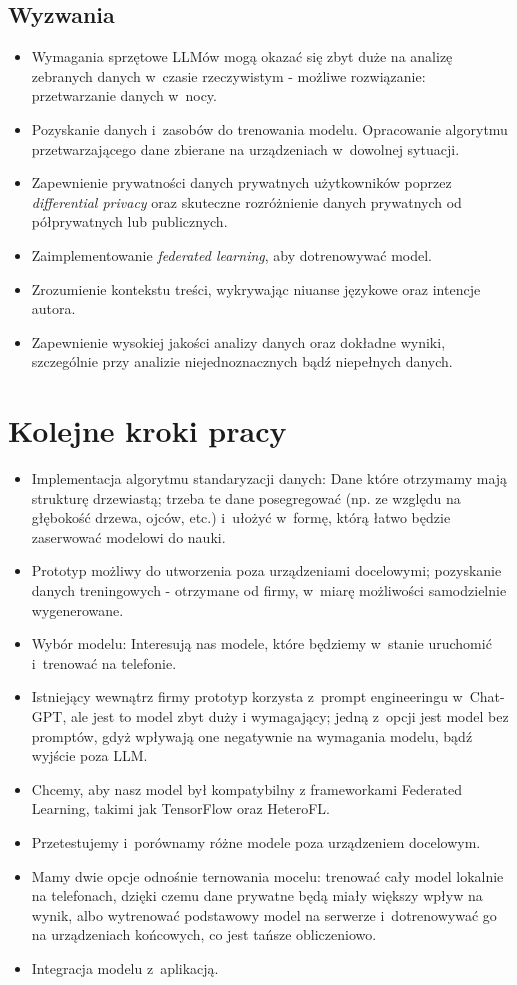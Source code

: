 \documentclass[12pt]{article}
\begin{document}
\subsection*{Wyzwania}
\begin{itemize}
    \item Wymagania sprzętowe LLMów mogą okazać się zbyt duże na analizę zebranych danych w~czasie rzeczywistym - możliwe rozwiązanie: przetwarzanie danych w~nocy.
    \item Pozyskanie danych i~zasobów do trenowania modelu. Opracowanie algorytmu przetwarzającego dane zbierane na urządzeniach w~dowolnej sytuacji.
    \item Zapewnienie prywatności danych prywatnych użytkowników poprzez \emph{differential privacy} oraz skuteczne rozróżnienie danych prywatnych od półprywatnych lub publicznych.
    \item Zaimplementowanie \emph{federated learning}, aby dotrenowywać model.
    \item Zrozumienie kontekstu treści, wykrywając niuanse językowe oraz intencje autora.
    \item Zapewnienie wysokiej jakości analizy danych oraz dokładne wyniki, szczególnie przy analizie niejednoznacznych bądź niepełnych danych.
\end{itemize}

\section*{Kolejne kroki pracy}
\begin{itemize}
    \item Implementacja algorytmu standaryzacji danych: Dane które otrzymamy mają strukturę drzewiastą; trzeba te dane posegregować (np. ze względu na głębokość drzewa, ojców, etc.) i~ułożyć w~formę, którą łatwo będzie zaserwować modelowi do nauki.
    \item Prototyp możliwy do utworzenia poza urządzeniami docelowymi; pozyskanie danych treningowych - otrzymane od firmy, w~miarę możliwości samodzielnie wygenerowane.
    \item Wybór modelu: Interesują nas modele, które będziemy w~stanie uruchomić i~trenować na telefonie.
    \item Istniejący wewnątrz firmy prototyp korzysta z~prompt engineeringu w~Chat-GPT, ale jest to model zbyt duży i wymagający; jedną z~opcji jest model bez promptów, gdyż wpływają one negatywnie na wymagania modelu, bądź wyjście poza LLM.
    \item Chcemy, aby nasz model był kompatybilny z frameworkami Federated Learning, takimi jak TensorFlow oraz HeteroFL.
    \item Przetestujemy i~porównamy różne modele poza urządzeniem docelowym.
    \item Mamy dwie opcje odnośnie ternowania mocelu: trenować cały model lokalnie na telefonach, 
    dzięki czemu dane prywatne będą miały większy wpływ na wynik, albo wytrenować podstawowy model na serwerze i~dotrenowywać go na urządzeniach końcowych, co jest tańsze obliczeniowo.
    \item Integracja modelu z~aplikacją.
\end{itemize}
\end{document}
